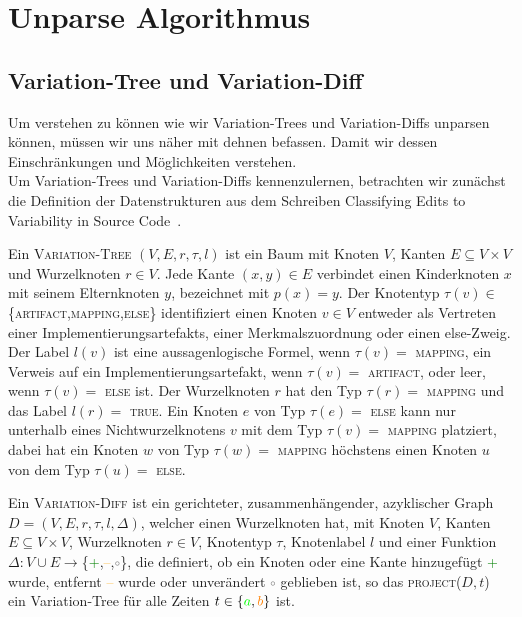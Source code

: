\chapter{Unparse Algorithmus}

\section{Variation-Tree und Variation-Diff}

Um verstehen zu können wie wir Variation-Trees und Variation-Diffs unparsen können, müssen wir uns näher mit dehnen befassen. Damit wir dessen Einschränkungen und Möglichkeiten verstehen.\\


Um Variation-Trees und Variation-Diffs kennenzulernen, betrachten wir zunächst die Definition der Datenstrukturen aus dem Schreiben Classifying Edits to Variability in Source Code~\cite{BTS+:ESECFSE22}.
\begin{definition}
	Ein \textsc{Variation-Tree}  $(V,E,r,\tau,l)$ ist ein Baum mit Knoten $V$, Kanten $E \subseteq V \times V$ und Wurzelknoten $r \in V$. Jede Kante $(x,y) \in E$ verbindet einen Kinderknoten $x$ mit seinem Elternknoten $y$, bezeichnet mit $p(x) = y$. Der Knotentyp $\tau(v) \in $ \{\textsc{artifact,mapping,else}\} identifiziert einen Knoten $v \in V$ entweder als Vertreten einer Implementierungsartefakts, einer Merkmalszuordnung oder einen else-Zweig. Der Label $l(v)$ ist eine aussagenlogische Formel, wenn $\tau(v) =$ \textsc{mapping}, ein Verweis auf ein Implementierungsartefakt, wenn $\tau(v) = $ \textsc{artifact}, oder leer, wenn $\tau(v) =$ \textsc{else} ist. Der Wurzelknoten $r$ hat den Typ $\tau(r) =$ \textsc{mapping} und das Label $l(r) = $ \textsc{true}. Ein Knoten $e$ von Typ $\tau(e) =$ \textsc{else} kann nur unterhalb eines Nichtwurzelknotens $v$ mit dem Typ $\tau(v) =$ \textsc{mapping} platziert, dabei hat ein Knoten $w$ von Typ $\tau(w) =$ \textsc{mapping} höchstens einen Knoten $u$ von dem Typ $\tau(u) =$ \textsc{else}.
\end{definition}
\begin{definition}
	Ein \textsc{Variation-Diff} ist ein gerichteter, zusammenhängender, azyklischer Graph $D=(V,E,r,\tau,l,\Delta) $, welcher einen Wurzelknoten hat, mit Knoten $V$, Kanten $E \subseteq V \times V$, Wurzelknoten $r \in V$, Knotentyp $\tau$, Knotenlabel $l$ und einer Funktion $\Delta : V \cup E \to $\{\textcolor{green}{+},\textcolor{orange}{--},\textcolor{gray}{$\circ$}\}, die definiert, ob ein Knoten oder eine Kante hinzugefügt \textcolor{green}{+} wurde, entfernt \textcolor{orange}{--} wurde oder unverändert \textcolor{gray}{$\circ$} geblieben ist, so das \textsc{project}($D,t$) ein Variation-Tree für alle Zeiten $t \in \{\textcolor{green}{a},\textcolor{orange}{b}\}$ ist.
\end{definition}
